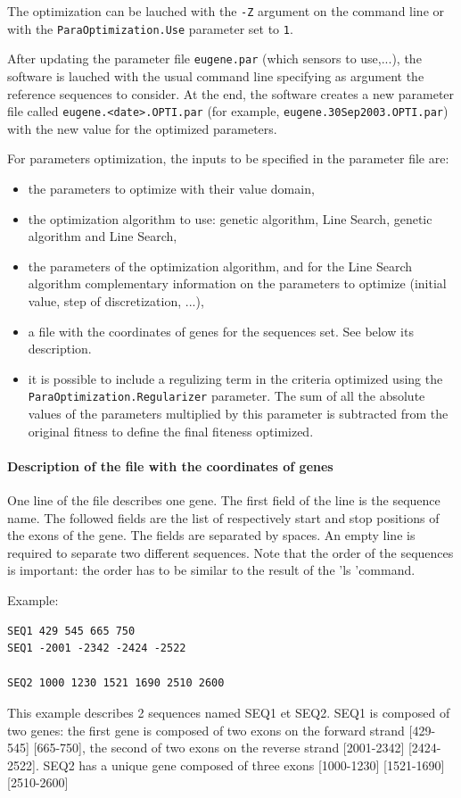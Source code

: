 \documentclass[a4paper,titlepage]{report}
\begin{document}
The optimization can be lauched with the \texttt{-Z} argument
 on the command line or
with the \texttt{ParaOptimi\-zation.Use} parameter set to \texttt{1}.

After updating the parameter file \texttt{eugene.par} (which sensors
to use,...), the software is lauched with the usual command line
specifying as argument the reference sequences to consider. At the
end, the software creates a new parameter file called
\texttt{eugene.<date>.OPTI.par} (for example,
\texttt{eugene.30Sep\-2003.OPTI.par}) with the new value for the
optimized parameters.

For parameters optimization, the inputs to be specified in the
parameter file are:
\begin{itemize}
\item the parameters to optimize with their value domain,
\item the optimization algorithm to use: genetic algorithm, Line
  Search, genetic algorithm and Line Search,
\item the parameters of the optimization algorithm, and for the Line
  Search algorithm complementary information on the parameters to
  optimize (initial value, step of discretization, ...),
\item a file with the coordinates of genes for the sequences set. See below its description.
\item it is possible to include a regulizing term in the criteria
optimized using the \texttt{ParaOptimization.Regularizer} parameter.
The sum of all the absolute values of the parameters multiplied by this parameter is subtracted from the original fitness to define the final fiteness optimized.\end{itemize}

\paragraph{Description of the file with the coordinates of genes}
One line of the file describes one gene. The first field of the line is the sequence name. The followed fields are the list of respectively start and stop positions of the exons of the gene. 
The fields are separated by spaces.
An empty line is required to separate two different sequences.
Note that the order of the sequences is important: the order has to be similar to the result of the 'ls 'command.

Example:
{\scriptsize \begin{verbatim}
SEQ1 429 545 665 750
SEQ1 -2001 -2342 -2424 -2522

SEQ2 1000 1230 1521 1690 2510 2600

\end{verbatim}}
This example describes 2 sequences named SEQ1 et SEQ2. SEQ1 is composed of two genes: the first gene is composed of two exons on the forward strand [429-545] [665-750], 
the second of two exons on the reverse strand [2001-2342] [2424-2522].
SEQ2 has a unique gene composed of three exons [1000-1230] [1521-1690] [2510-2600]
\end{document}
